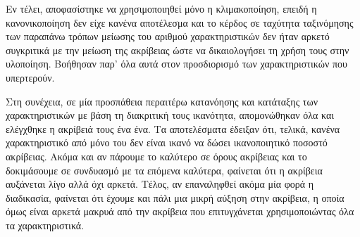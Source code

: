 Εν τέλει, αποφασίστηκε να χρησιμοποιηθεί μόνο η κλιμακοποίηση, επειδή η κανονικοποίηση δεν είχε κανένα αποτέλεσμα και το κέρδος σε ταχύτητα ταξινόμησης των παραπάνω τρόπων μείωσης του αριθμού χαρακτηριστικών δεν ήταν αρκετό συγκριτικά με την μείωση της ακρίβειας ώστε να δικαιολογήσει τη χρήση τους στην υλοποίηση. Βοήθησαν παρ' όλα αυτά στον προσδιορισμό των χαρακτηριστικών που υπερτερούν.

Στη συνέχεια, σε μία προσπάθεια περαιτέρω κατανόησης και κατάταξης των χαρακτηριστικών με βάση τη διακριτική τους ικανότητα, απομονώθηκαν όλα και ελέγχθηκε η ακρίβειά τους ένα ένα. Τα αποτελέσματα έδειξαν ότι, τελικά, κανένα χαρακτηριστικό από μόνο του δεν είναι ικανό να δώσει ικανοποιητικό ποσοστό ακρίβειας. Ακόμα και αν πάρουμε το καλύτερο σε όρους ακρίβειας και το δοκιμάσουμε σε συνδυασμό με τα επόμενα καλύτερα, φαίνεται ότι η ακρίβεια αυξάνεται λίγο αλλά όχι αρκετά. Τέλος, αν επαναληφθεί ακόμα μία φορά η διαδικασία, φαίνεται ότι έχουμε και πάλι μια μικρή αύξηση στην ακρίβεια, η οποία όμως είναι αρκετά μακρυά από την ακρίβεια που επιτυγχάνεται χρησιμοποιώντας όλα τα χαρακτηριστικά.

